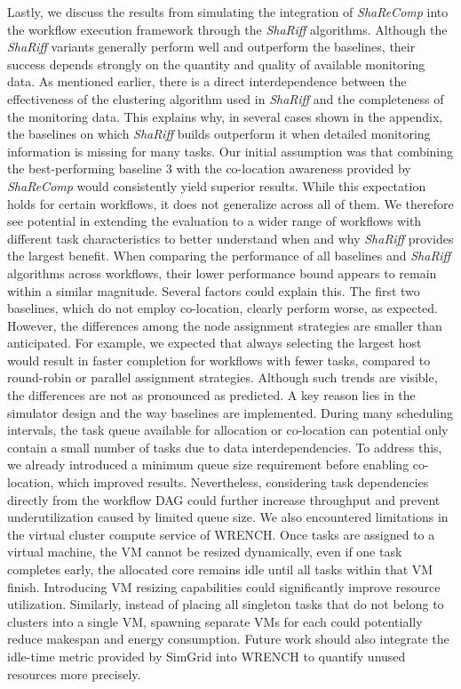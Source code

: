 Lastly, we discuss the results from simulating the integration of \textit{ShaReComp} into the workflow execution framework through the \textit{ShaRiff} algorithms. Although the \textit{ShaRiff} variants generally perform well and outperform the baselines, their success depends strongly on the quantity and quality of available monitoring data. As mentioned earlier, there is a direct interdependence between the effectiveness of the clustering algorithm used in \textit{ShaRiff} and the completeness of the monitoring data. This explains why, in several cases shown in the appendix, the baselines on which \textit{ShaRiff} builds outperform it when detailed monitoring information is missing for many tasks.
Our initial assumption was that combining the best-performing baseline 3 with the co-location awareness provided by \textit{ShaReComp} would consistently yield superior results. While this expectation holds for certain workflows, it does not generalize across all of them. We therefore see potential in extending the evaluation to a wider range of workflows with different task characteristics to better understand when and why \textit{ShaRiff} provides the largest benefit.
When comparing the performance of all baselines and \textit{ShaRiff} algorithms across workflows, their lower performance bound appears to remain within a similar magnitude. Several factors could explain this. The first two baselines, which do not employ co-location, clearly perform worse, as expected. However, the differences among the node assignment strategies are smaller than anticipated. For example, we expected that always selecting the largest host would result in faster completion for workflows with fewer tasks, compared to round-robin or parallel assignment strategies. Although such trends are visible, the differences are not as pronounced as predicted.
A key reason lies in the simulator design and the way baselines are implemented. During many scheduling intervals, the task queue available for allocation or co-location can potential only contain a small number of tasks due to data interdependencies. To address this, we already introduced a minimum queue size requirement before enabling co-location, which improved results. Nevertheless, considering task dependencies directly from the workflow DAG could further increase throughput and prevent underutilization caused by limited queue size.
We also encountered limitations in the virtual cluster compute service of WRENCH. Once tasks are assigned to a virtual machine, the VM cannot be resized dynamically, even if one task completes early, the allocated core remains idle until all tasks within that VM finish. Introducing VM resizing capabilities could significantly improve resource utilization. Similarly, instead of placing all singleton tasks that do not belong to clusters into a single VM, spawning separate VMs for each could potentially reduce makespan and energy consumption. Future work should also integrate the idle-time metric provided by SimGrid into WRENCH to quantify unused resources more precisely.
